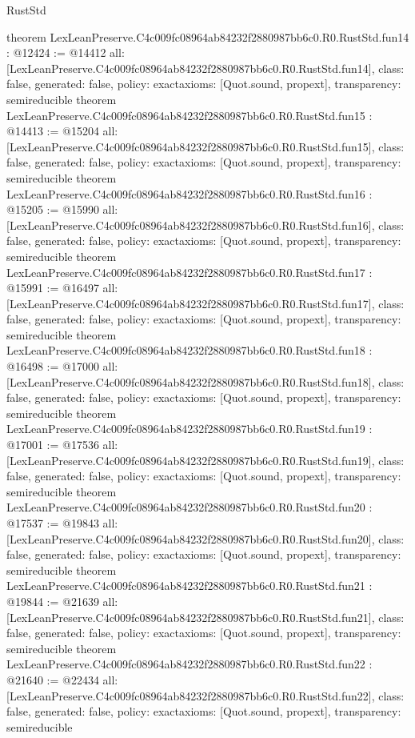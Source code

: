 \begin{lexlean}{RustStd}
\begin{coremodule}
{}
theorem LexLeanPreserve.C4c009fc08964ab84232f2880987bb6c0.R0.RustStd.fun14 : @12424 := @14412 {
  all: [LexLeanPreserve.C4c009fc08964ab84232f2880987bb6c0.R0.RustStd.fun14],
  class: false,
  generated: false,
  policy: exact{axioms: [Quot.sound, propext]},
  transparency: semireducible
}
theorem LexLeanPreserve.C4c009fc08964ab84232f2880987bb6c0.R0.RustStd.fun15 : @14413 := @15204 {
  all: [LexLeanPreserve.C4c009fc08964ab84232f2880987bb6c0.R0.RustStd.fun15],
  class: false,
  generated: false,
  policy: exact{axioms: [Quot.sound, propext]},
  transparency: semireducible
}
theorem LexLeanPreserve.C4c009fc08964ab84232f2880987bb6c0.R0.RustStd.fun16 : @15205 := @15990 {
  all: [LexLeanPreserve.C4c009fc08964ab84232f2880987bb6c0.R0.RustStd.fun16],
  class: false,
  generated: false,
  policy: exact{axioms: [Quot.sound, propext]},
  transparency: semireducible
}
theorem LexLeanPreserve.C4c009fc08964ab84232f2880987bb6c0.R0.RustStd.fun17 : @15991 := @16497 {
  all: [LexLeanPreserve.C4c009fc08964ab84232f2880987bb6c0.R0.RustStd.fun17],
  class: false,
  generated: false,
  policy: exact{axioms: [Quot.sound, propext]},
  transparency: semireducible
}
theorem LexLeanPreserve.C4c009fc08964ab84232f2880987bb6c0.R0.RustStd.fun18 : @16498 := @17000 {
  all: [LexLeanPreserve.C4c009fc08964ab84232f2880987bb6c0.R0.RustStd.fun18],
  class: false,
  generated: false,
  policy: exact{axioms: [Quot.sound, propext]},
  transparency: semireducible
}
theorem LexLeanPreserve.C4c009fc08964ab84232f2880987bb6c0.R0.RustStd.fun19 : @17001 := @17536 {
  all: [LexLeanPreserve.C4c009fc08964ab84232f2880987bb6c0.R0.RustStd.fun19],
  class: false,
  generated: false,
  policy: exact{axioms: [Quot.sound, propext]},
  transparency: semireducible
}
theorem LexLeanPreserve.C4c009fc08964ab84232f2880987bb6c0.R0.RustStd.fun20 : @17537 := @19843 {
  all: [LexLeanPreserve.C4c009fc08964ab84232f2880987bb6c0.R0.RustStd.fun20],
  class: false,
  generated: false,
  policy: exact{axioms: [Quot.sound, propext]},
  transparency: semireducible
}
theorem LexLeanPreserve.C4c009fc08964ab84232f2880987bb6c0.R0.RustStd.fun21 : @19844 := @21639 {
  all: [LexLeanPreserve.C4c009fc08964ab84232f2880987bb6c0.R0.RustStd.fun21],
  class: false,
  generated: false,
  policy: exact{axioms: [Quot.sound, propext]},
  transparency: semireducible
}
theorem LexLeanPreserve.C4c009fc08964ab84232f2880987bb6c0.R0.RustStd.fun22 : @21640 := @22434 {
  all: [LexLeanPreserve.C4c009fc08964ab84232f2880987bb6c0.R0.RustStd.fun22],
  class: false,
  generated: false,
  policy: exact{axioms: [Quot.sound, propext]},
  transparency: semireducible
}
\end{coremodule}
\end{lexlean}
